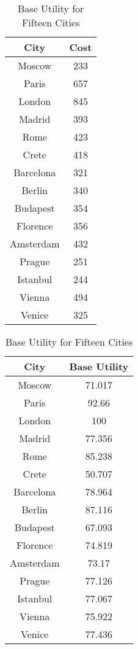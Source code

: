\documentclass[12pt]{article}
\begin{document}
\begin{table}[ht!]
	\begin{minipage}[b]{0.45\linewidth}
		\caption{High Daily costs of Fifteen Cities}
		\centering
		\vspace{1mm}
		\begin{tabular}{c|c}
			\hline
			\rule{0pt}{2ex} City & Cost  \\
			\hline
			\rule{0pt}{2ex}Moscow & 233 \\
			Paris & 657 \\
			London & 845 \\
			Madrid & 393 \\
			Rome & 423 \\
			Crete & 418 \\
			Barcelona & 321 \\
			Berlin & 340 \\
			Budapest & 354 \\
			Florence & 356 \\
			Amsterdam & 432 \\
			Prague & 251 \\
			Istanbul & 244 \\
			Vienna & 494 \\
			Venice & 325 \\
		\end{tabular}
	\end{minipage}
	\hspace{0.5cm}
	\begin{minipage}[b]{0.45\linewidth}
		\caption{Base Utility for Fifteen Cities}
		\centering
		\vspace{1mm}
		\begin{tabular}{c|c}
				\hline
				\rule{0pt}{2ex} City & Base Utility  \\
				\hline
				\rule{0pt}{2ex}Moscow & 71.017 \\
				Paris & 92.66 \\
				London & 100 \\
				Madrid & 77.356 \\
				Rome & 85.238 \\
				Crete & 50.707 \\
				Barcelona & 78.964 \\
				Berlin & 87.116 \\
				Budapest & 67.093 \\
				Florence & 74.819 \\
				Amsterdam & 73.17 \\
				Prague & 77.126 \\
				Istanbul & 77.067 \\
				Vienna & 75.922 \\
				Venice & 77.436 \\
			\end{tabular}
	\end{minipage}
\end{table}
\end{document}
